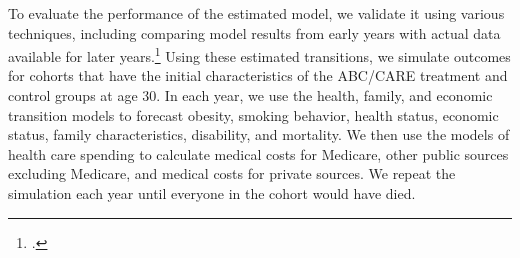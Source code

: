 \noindent To evaluate the performance of the estimated model, we validate it using various techniques, including comparing model results from early years with actual data available for later years.\footnote{\citet{Goldman_etal_2015_Future-America-Model}.} Using these estimated transitions, we simulate outcomes for cohorts that have the initial characteristics of the ABC/CARE treatment and control groups at age 30. In each year, we use the health, family, and economic transition models to forecast obesity, smoking behavior, health status, economic status, family characteristics, disability, and mortality. We then use the models of health care spending to calculate medical costs for Medicare, other public sources excluding Medicare, and medical costs for private sources. We repeat the simulation each year until everyone in the cohort would have died. 
